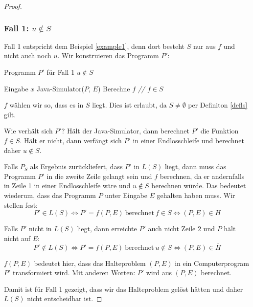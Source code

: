 \documentclass[journal]{IEEEtran}
\begin{document}
\begin{proof}
\subsubsection{Fall 1: $u \notin S$}

Fall 1 entspricht dem Beispiel \ref{example1}, denn dort besteht $S$ nur aus $f$ und nicht auch noch $u$. Wir konstruieren das Programm $P'$:

\begin{algorithm}
\caption{Programm $P'$ für Fall 1 $u \notin S$}
\begin{algorithmic}[1]
\renewcommand{\algorithmicrequire}{\textbf{Input:}}
\renewcommand{\algorithmicensure}{\textbf{Output:}}
\REQUIRE Eingabe $x$
\STATE Java-Simulator($P$, $E$)
\STATE Berechne $f$ \textit{// $f \in S$}
\end{algorithmic}
\end{algorithm}

$f$ wählen wir so, dass es in $S$ liegt. Dies ist erlaubt, da $S \ne \emptyset$ per Definiton \ref{defls} gilt.

Wie verhält sich $P'$? Hält der Java-Simulator, dann berechnet $P'$ die Funktion $f \in S$. Hält er nicht, dann verfängt sich $P'$ in einer Endlosschleife und berechnet daher $u \notin S$.

Falls $P_S$ als Ergebnis zurückliefert, dass $P'$ in $L(S)$ liegt, dann muss das Programm $P'$ in die zweite Zeile gelangt sein und $f$ berechnen, da er andernfalls in Zeile 1 in einer Endlosschleife wäre und $u \notin S$ berechnen würde. Das bedeutet wiederum, dass das Programm $P$ unter Eingabe $E$ gehalten haben muss. Wir stellen fest:
\begin{equation*}
P' \in L(S) \Leftrightarrow P' = f(P, E) \ \text{berechnet} \ f \in S \Leftrightarrow (P, E) \in H
\end{equation*}

Falls $P'$ nicht in $L(S)$ liegt, dann erreichte $P'$ auch nicht Zeile 2 und $P$ hält nicht auf $E$:
\begin{equation*}
P' \notin L(S) \Leftrightarrow P' = f(P, E) \ \text{berechnet} \ u \notin S \Leftrightarrow (P, E) \in \overline{H}
\end{equation*}

$f(P, E)$ bedeutet hier, dass das Halteproblem $(P, E)$ in ein Computerprogram $P'$ transformiert wird. Mit anderen Worten: $P'$ wird aus $(P, E)$ berechnet.

Damit ist für Fall 1 gezeigt, dass wir das Halteproblem gelöst hätten und daher $L(S)$ nicht entscheidbar ist.


\end{proof}
\end{document}
